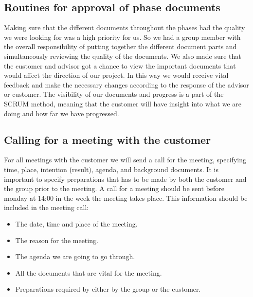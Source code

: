 \subsection{Routines for approval of phase documents}
Making sure that the different documents throughout the phases had the quality we were looking for was a high priority for us. So we had a group member with the overall responsibility of putting together the different document parts and simultaneously reviewing the quality of the documents.
\newline
\newline 
We also made sure that the customer and advisor got a chance to view the important documents that would affect the direction of our project. In this way we would receive vital feedback and make the necessary changes according to the response of the advisor or customer. 
\newline
\newline
The visibility of our documents and progress is a part of the SCRUM method, meaning that the customer will have insight into what we are doing and how far we have progressed.   

\subsection{Calling for a meeting with the customer}
For all meetings with the customer we will send a call for the meeting, specifying time, place, intention (result), agenda, and background documents. It is important to specify preparations that has to be made by both the customer and the group prior to the meeting.
\newline
\newline
A call for a meeting should be sent before monday at 14:00 in the week the meeting takes place.
\newline
\newline
This information should be included in the meeting call:
\begin{itemize}
\item{}The date, time and place of the meeting.
\item{}The reason for the meeting.
\item{}The agenda we are going to go through.
\item{}All the documents that are vital for the meeting.
\item{}Preparations required by either by the group or the customer.
\end{itemize}

